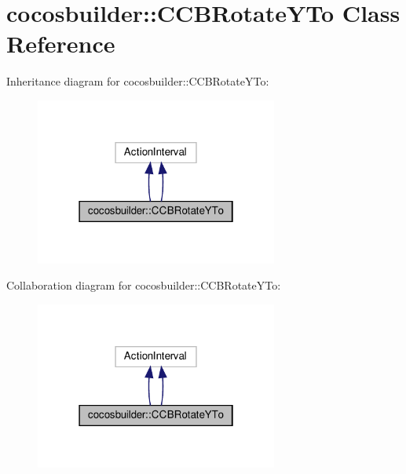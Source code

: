 \hypertarget{classcocosbuilder_1_1CCBRotateYTo}{}\section{cocosbuilder\+:\+:C\+C\+B\+Rotate\+Y\+To Class Reference}
\label{classcocosbuilder_1_1CCBRotateYTo}


Inheritance diagram for cocosbuilder\+:\+:C\+C\+B\+Rotate\+Y\+To\+:
\nopagebreak
\begin{figure}[H]
\begin{center}
\leavevmode
\includegraphics[width=226pt]{classcocosbuilder_1_1CCBRotateYTo__inherit__graph}
\end{center}
\end{figure}


Collaboration diagram for cocosbuilder\+:\+:C\+C\+B\+Rotate\+Y\+To\+:
\nopagebreak
\begin{figure}[H]
\begin{center}
\leavevmode
\includegraphics[width=226pt]{classcocosbuilder_1_1CCBRotateYTo__coll__graph}
\end{center}
\end{figure}
